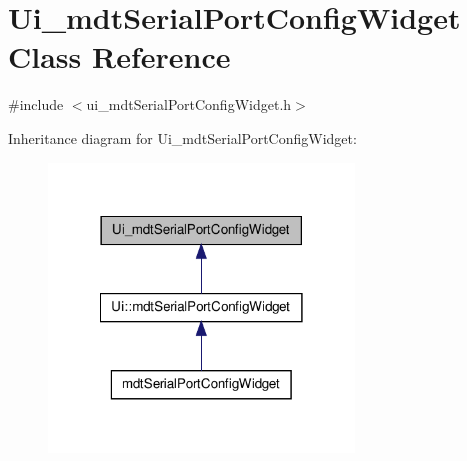 \hypertarget{class_ui__mdt_serial_port_config_widget}{\section{Ui\-\_\-mdt\-Serial\-Port\-Config\-Widget Class Reference}
\label{class_ui__mdt_serial_port_config_widget}
}


{\ttfamily \#include $<$ui\-\_\-mdt\-Serial\-Port\-Config\-Widget.\-h$>$}



Inheritance diagram for Ui\-\_\-mdt\-Serial\-Port\-Config\-Widget\-:
\nopagebreak
\begin{figure}[H]
\begin{center}
\leavevmode
\includegraphics[width=230pt]{class_ui__mdt_serial_port_config_widget__inherit__graph}
\end{center}
\end{figure}


